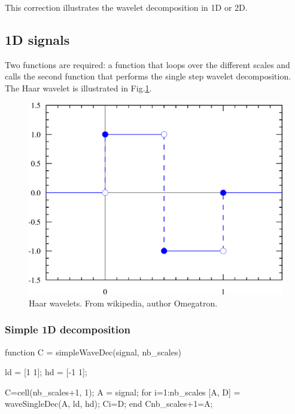 \def\QRCODE{MASTER_mispa_TUT.IMG.wavelets_matlabqrcode.png}
\def\QRPAGE{http://www.iptutorials.science/tree/master/MASTER_mispa/TUT.IMG.wavelets/matlab}



\begin{note}This correction illustrates the wavelet decomposition in 1D or 2D.\end{note}

\subsection{1D signals}
Two functions are required: a function that loops over the different scales and calls the second function that performs the single step wavelet decomposition. The Haar wavelet is illustrated in Fig.\ref{fig:wavelets:matlab:haar}.

\begin{figure}[htbp]
 \centering
 \includegraphics[width=.7\linewidth]{Haar_wavelet.pdf}
 \caption{Haar wavelets. From wikipedia, author Omegatron.}
 \label{fig:wavelets:matlab:haar}
\end{figure}

\subsubsection{Simple 1D decomposition}
\begin{matlab}
function C = simpleWaveDec(signal, nb_scales)

ld = [1 1];
hd = [-1 1];

C=cell(nb_scales+1, 1);
A = signal; %
for i=1:nb_scales
    [A, D] = waveSingleDec(A, ld, hd);
    C{i}=D;
end
C{nb_scales+1}=A;
\end{matlab}

